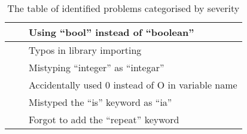 \begin{table}[]
\begin{tabular}{| p{5cm} | p{5cm} | p{5cm} |}
                                                           &                                                                    & Using “bool” instead of “boolean”                                                                        \\ \hline
                                                           &                                                                    & Typos in library importing                                                                               \\ \hline
                                                           &                                                                    & Mistyping “integer” as “integar”                                                                         \\ \hline
                                                           &                                                                    & Accidentally used 0 instead of O in variable name                                                        \\ \hline
                                                           &                                                                    & Mistyped the “is” keyword as “ia”                                                                        \\ \hline
                                                           &                                                                    & Forgot to add the “repeat” keyword                                                                       \\ \hline
\end{tabular}
\caption{The table of identified problems categorised by severity}
\end{table}

